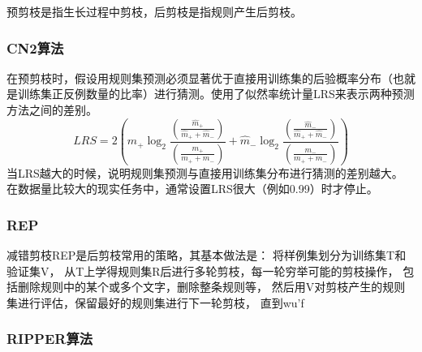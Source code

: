 \documentclass[UTF8]{article}
\begin{document}
    预剪枝是指生长过程中剪枝，后剪枝是指规则产生后剪枝。
\subsubsection{CN2算法}
    在预剪枝时，假设用规则集预测必须显著优于直接用训练集的后验概率分布（也就是训练集正反例数量的比率）进行猜测。使用了似然率统计量LRS来表示两种预测方法之间的差别。
    \begin{equation}
        LRS = 2(\hat{m}_+ \log_2{\frac{(\frac{\hat{m}_+}{\hat{m}_+ + \hat{m}_-})}{(\frac{m_+}{m_+ + m_-})}} + 
        \hat{m}_- \log_2{\frac{(\frac{\hat{m}_-}{\hat{m}_+ + \hat{m}_-})}{(\frac{m_-}{m_+ + m_-})}})
    \end{equation}
    当LRS越大的时候，说明规则集预测与直接用训练集分布进行猜测的差别越大。
    在数据量比较大的现实任务中，通常设置LRS很大（例如0.99）时才停止。
\subsubsection{REP}
    减错剪枝REP是后剪枝常用的策略，其基本做法是：
    将样例集划分为训练集T和验证集V，
    从T上学得规则集R后进行多轮剪枝，每一轮穷举可能的剪枝操作，
    包括删除规则中的某个或多个文字，删除整条规则等，
    然后用V对剪枝产生的规则集进行评估，保留最好的规则集进行下一轮剪枝，
    直到wu'f
\subsubsection{RIPPER算法}
\end{document}
